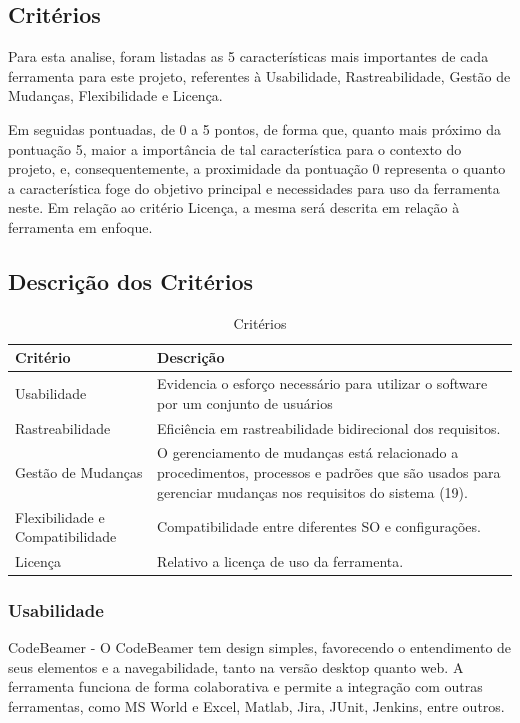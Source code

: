 \subsection {Critérios}

Para esta analise, foram listadas as 5 características mais importantes de cada ferramenta para este projeto, referentes à Usabilidade, Rastreabilidade, Gestão de Mudanças, Flexibilidade e Licença.

Em seguidas pontuadas, de 0 a 5 pontos, de forma que, quanto mais próximo da pontuação 5, maior a importância de tal característica para o contexto do projeto, e, consequentemente, a proximidade da pontuação 0 representa o quanto a característica foge do objetivo principal e necessidades para uso da ferramenta neste. Em relação ao critério Licença, a mesma será descrita em relação à ferramenta em enfoque.

\subsection {Descrição dos Critérios}

\begin{table}[\htp]
\centering
\caption{Critérios}
\label{my-label}
\begin{tabular}{|l|l|}
\hline
Critério     & Descrição                                         \\ \hline
Usabilidade &  Evidencia o esforço necessário para utilizar o software por um conjunto de usuários \\ \hline
Rastreabilidade & Eficiência em rastreabilidade bidirecional dos requisitos.\\ \hline
Gestão de Mudanças & O gerenciamento de mudanças está relacionado a procedimentos, processos e padrões que são usados para gerenciar mudanças nos requisitos do sistema (19).\\ \hline
Flexibilidade e Compatibilidade
 & Compatibilidade entre diferentes SO e configurações. \\ \hline
Licença & Relativo a licença de uso da ferramenta. \\ \hline

\end{tabular}
\end{table}
\subsubsection{Usabilidade}

CodeBeamer - O CodeBeamer tem design simples, favorecendo o entendimento de seus elementos e a navegabilidade, tanto na versão desktop quanto web. A ferramenta funciona de forma colaborativa e permite a integração com outras ferramentas, como MS World e Excel, Matlab, Jira, JUnit, Jenkins, entre outros.

